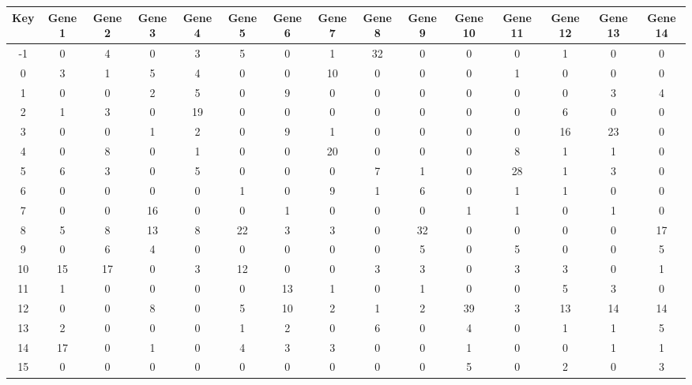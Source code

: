 \begin{tabular}{|c|c|c|c|c|c|c|c|c|c|c|c|c|c|c|}
\hline
Key & Gene 1 & Gene 2 & Gene 3 & Gene 4 & Gene 5 & Gene 6 & Gene 7 & Gene 8 & Gene 9 & Gene 10 & Gene 11 & Gene 12 & Gene 13 & Gene 14 \\
\hline
-1 & 0 & 4 & 0 & 3 & 5 & 0 & 1 & 32 & 0 & 0 & 0 & 1 & 0 & 0 \\
0 & 3 & 1 & 5 & 4 & 0 & 0 & 10 & 0 & 0 & 0 & 1 & 0 & 0 & 0 \\
1 & 0 & 0 & 2 & 5 & 0 & 9 & 0 & 0 & 0 & 0 & 0 & 0 & 3 & 4 \\
2 & 1 & 3 & 0 & 19 & 0 & 0 & 0 & 0 & 0 & 0 & 0 & 6 & 0 & 0 \\
3 & 0 & 0 & 1 & 2 & 0 & 9 & 1 & 0 & 0 & 0 & 0 & 16 & 23 & 0 \\
4 & 0 & 8 & 0 & 1 & 0 & 0 & 20 & 0 & 0 & 0 & 8 & 1 & 1 & 0 \\
5 & 6 & 3 & 0 & 5 & 0 & 0 & 0 & 7 & 1 & 0 & 28 & 1 & 3 & 0 \\
6 & 0 & 0 & 0 & 0 & 1 & 0 & 9 & 1 & 6 & 0 & 1 & 1 & 0 & 0 \\
7 & 0 & 0 & 16 & 0 & 0 & 1 & 0 & 0 & 0 & 1 & 1 & 0 & 1 & 0 \\
8 & 5 & 8 & 13 & 8 & 22 & 3 & 3 & 0 & 32 & 0 & 0 & 0 & 0 & 17 \\
9 & 0 & 6 & 4 & 0 & 0 & 0 & 0 & 0 & 5 & 0 & 5 & 0 & 0 & 5 \\
10 & 15 & 17 & 0 & 3 & 12 & 0 & 0 & 3 & 3 & 0 & 3 & 3 & 0 & 1 \\
11 & 1 & 0 & 0 & 0 & 0 & 13 & 1 & 0 & 1 & 0 & 0 & 5 & 3 & 0 \\
12 & 0 & 0 & 8 & 0 & 5 & 10 & 2 & 1 & 2 & 39 & 3 & 13 & 14 & 14 \\
13 & 2 & 0 & 0 & 0 & 1 & 2 & 0 & 6 & 0 & 4 & 0 & 1 & 1 & 5 \\
14 & 17 & 0 & 1 & 0 & 4 & 3 & 3 & 0 & 0 & 1 & 0 & 0 & 1 & 1 \\
15 & 0 & 0 & 0 & 0 & 0 & 0 & 0 & 0 & 0 & 5 & 0 & 2 & 0 & 3 \\
\hline
\end{tabular}